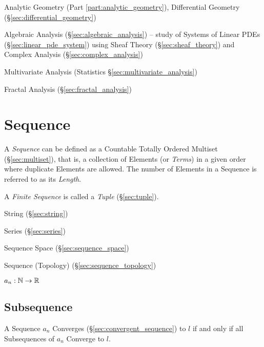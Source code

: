 \fist Analytic Geometry (Part \ref{part:analytic_geometry}), Differential
Geometry (\S\ref{sec:differential_geometry})

\fist Algebraic Analysis (\S\ref{sec:algebraic_analysis}) -- study of Systems of
Linear PDEs (\S\ref{sec:linear_pde_system}) using Sheaf Theory
(\S\ref{sec:sheaf_theory}) and Complex Analysis (\S\ref{sec:complex_analysis})

\fist Multivariate Analysis (Statistics \S\ref{sec:multivariate_analysis})

\fist Fractal Analysis (\S\ref{sec:fractal_analysis})



\section{Sequence}\label{sec:sequence}

A \emph{Sequence} can be defined as a Countable Totally Ordered
Multiset (\S\ref{sec:multiset}), that is, a collection of Elements (or
\emph{Terms}) in a given order where duplicate Elements are allowed.
The number of Elements in a Sequence is referred to as its
\emph{Length}.

A \emph{Finite Sequence} is called a \emph{Tuple} (\S\ref{sec:tuple}).

String (\S\ref{sec:string})

Series (\S\ref{sec:series})

Sequence Space (\S\ref{sec:sequence_space})

Sequence (Topology) (\S\ref{sec:sequence_topology})

$a_n : \mathbb{N} \rightarrow \mathbb{R}$



\subsection{Subsequence}\label{sec:subsequence}

A Sequence $a_n$ Converges (\S\ref{sec:convergent_sequence}) to $l$
if and only if all Subsequences of $a_n$ Converge to $l$.




